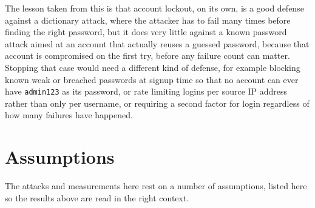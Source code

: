 \documentclass[11pt]{article}
\begin{document}
The lesson taken from this is that account lockout, on its own, is a good
defense against a dictionary attack, where the attacker has to fail many
times before finding the right password, but it does very little against a
known password attack aimed at an account that actually reuses a guessed
password, because that account is compromised on the first try, before any
failure count can matter. Stopping that case would need a different kind
of defense, for example blocking known weak or breached passwords at
signup time so that no account can ever have \texttt{admin123} as its
password, or rate limiting logins per source IP address rather than only
per username, or requiring a second factor for login regardless of how
many failures have happened.

\section{Assumptions}
\label{sec:assumptions}

The attacks and measurements here rest on a number of assumptions, listed
here so the results above are read in the right context.
\end{document}
